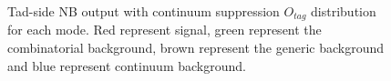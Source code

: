 \begin{figure}[ht]
{		\label{ksnbout}
	}
	\caption{Tad-side NB output with continuum suppression $O_{tag}$ distribution for each mode. Red represent signal, green represent the combinatorial background,  brown represent the generic background and blue represent continuum background.}
    	\label{fig:nbout}	
\end{figure}

    \begin{figure}[ht]
	\centering
\end{figure}
